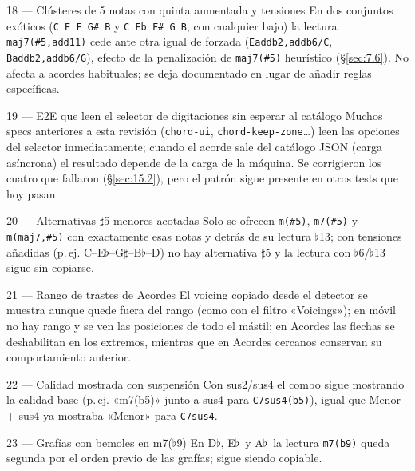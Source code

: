 \documentclass[a4paper,11pt,oneside]{report}
\newcommand{\Sref}[1]{\S\ref{#1}}
\newcommand{\flt}{\ensuremath{\flat}}
\newcommand{\shp}{\ensuremath{\sharp}}
\begin{document}
\begin{hallazgobox}{18 --- Clústeres de 5 notas con quinta aumentada y tensiones}
En dos conjuntos exóticos (\lstinline!C E F G# B! y \lstinline!C Eb F# G B!, con cualquier bajo) la lectura \lstinline!maj7(#5,add11)! cede ante otra igual de forzada (\lstinline!Eaddb2,addb6/C!, \lstinline!Baddb2,addb6/G!), efecto de la penalización de \lstinline!maj7(#5)! heurístico (\Sref{sec:7.6}). No afecta a acordes habituales; se deja documentado en lugar de añadir reglas específicas.
\end{hallazgobox}

\begin{hallazgobox}{19 --- E2E que leen el selector de digitaciones sin esperar al catálogo}
Muchos specs anteriores a esta revisión (\lstinline!chord-ui!, \lstinline!chord-keep-zone!\ldots) leen las opciones del selector inmediatamente; cuando el acorde sale del catálogo JSON (carga asíncrona) el resultado depende de la carga de la máquina. Se corrigieron los cuatro que fallaron (\Sref{sec:15.2}), pero el patrón sigue presente en otros tests que hoy pasan.
\end{hallazgobox}

\begin{hallazgobox}{20 --- Alternativas \shp5 menores acotadas}
Solo se ofrecen \lstinline!m(#5)!, \lstinline!m7(#5)! y \lstinline!m(maj7,#5)! con exactamente esas notas y detrás de su lectura \flt13; con tensiones añadidas (p.\,ej. C--E\flt--G\shp--B\flt--D) no hay alternativa \shp5 y la lectura con \flt6/\flt13 sigue sin copiarse.
\end{hallazgobox}

\begin{hallazgobox}{21 --- Rango de trastes de Acordes}
El voicing copiado desde el detector se muestra aunque quede fuera del rango (como con el filtro «Voicings»); en móvil no hay rango y se ven las posiciones de todo el mástil; en Acordes las flechas se deshabilitan en los extremos, mientras que en Acordes cercanos conservan su comportamiento anterior.
\end{hallazgobox}

\begin{hallazgobox}{22 --- Calidad mostrada con suspensión}
Con sus2/sus4 el combo sigue mostrando la calidad base (p.\,ej. «m7(b5)» junto a sus4 para \lstinline!C7sus4(b5)!), igual que Menor + sus4 ya mostraba «Menor» para \lstinline!C7sus4!.
\end{hallazgobox}

\begin{hallazgobox}{23 --- Grafías con bemoles en m7(\flt9)}
En D\flt, E\flt\ y A\flt\ la lectura \lstinline!m7(b9)! queda segunda por el orden previo de las grafías; sigue siendo copiable.
\end{hallazgobox}
\end{document}
